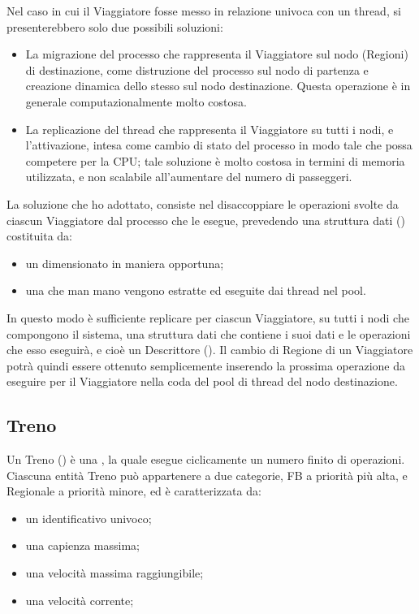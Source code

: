 	Nel caso in cui il Viaggiatore fosse messo in relazione univoca con un thread, si presenterebbero solo due possibili soluzioni:
		\begin{itemize}
			\item La migrazione del processo che rappresenta il Viaggiatore sul nodo (Regioni) di destinazione, come distruzione del processo sul nodo di partenza e creazione dinamica dello stesso sul nodo destinazione. Questa operazione è in generale computazionalmente molto costosa. 
			\item La replicazione del thread che rappresenta il Viaggiatore su tutti i nodi, e l'attivazione, intesa come cambio di stato del processo in modo tale che possa competere per la CPU; tale soluzione è molto costosa in termini di memoria utilizzata, e non scalabile all'aumentare del numero di passeggeri.
		\end{itemize}
		
	La soluzione che ho adottato, consiste nel disaccoppiare le operazioni svolte da ciascun Viaggiatore dal processo che le esegue, prevedendo una struttura dati () costituita da:
		\begin{itemize}
			\item un  dimensionato in maniera opportuna;
			\item una  che man mano vengono estratte ed eseguite dai thread nel pool.
		\end{itemize}
	In questo modo è sufficiente replicare per ciascun Viaggiatore, su tutti i nodi che compongono il sistema, una struttura dati che contiene i suoi dati e le operazioni che esso eseguirà, e cioè un Descrittore (). 
	Il cambio di Regione di un Viaggiatore potrà quindi essere ottenuto semplicemente inserendo la prossima operazione da eseguire per il Viaggiatore nella coda del pool di thread del nodo destinazione.
	
	\subsection{Treno} \label{subsec:train_def}
	Un Treno () è una , la quale esegue ciclicamente un numero finito di operazioni. Ciascuna entità Treno può appartenere a due categorie, FB a priorità più alta, e Regionale a priorità minore, ed è caratterizzata da:
		\begin{itemize}
			\item un identificativo univoco;
			\item una capienza massima;
			\item una velocità massima raggiungibile;
			\item una velocità corrente;
		\end{itemize}
	
